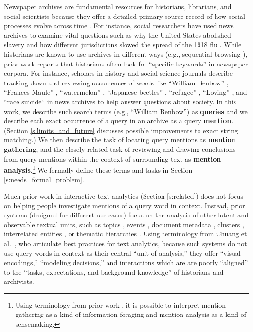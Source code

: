 Newspaper archives are fundamental resources for historians, librarians, and social scientists \cite{Chassanoff,allen} because they offer a detailed primary source record of how social processes evolve across time \cite{pierson2004politics}.
For instance, social researchers have used news archives to examine vital questions such as why the United States abolished slavery \cite{foner1995free} and how different jurisdictions slowed the spread of the 1918 flu \cite{jama}.
While historians are known to use archives in different ways (e.g., sequential browsing \cite{allen}), prior work reports that historians often look for ``specific keywords'' \cite[p. 2]{allen} in newspaper corpora.
For instance, scholars in history and social science journals describe tracking down and reviewing occurrences of words like
``William Benbow'' \cite{Putnam},
{``Frances Maule''} \cite{FrancesMaule},
{``watermelon'' }\cite{watermelon},
{``Japanese beetles''} \cite{japanesebeetles},
{``refugee''} \cite{katrinarefugee},
{``Loving''} \cite{Loving}, and
{``race suicide''} \cite{racesuicide}
in news archives
to help answer questions about society.
In this work, we describe such search terms (e.g., ``William Benbow'') as \textbf{queries} and we describe each exact occurrence of a query in an archive as a query \textbf{mention}.
(Section \ref{s:limits_and_future} discusses possible improvements to exact string matching.)
We then describe the task of locating query mentions as \textbf{mention gathering}, and the closely-related task of reviewing and drawing conclusions from query mentions within the context of surrounding text as \textbf{mention analysis}.\footnote{
Using terminology from prior work \cite{pirolli2005sensemaking}, it is possible to interpret mention gathering as a kind of information foraging and mention analysis as a kind of sensemaking.}
We formally define these terms and tasks in Section \ref{s:needs_formal_problem}.

Much prior work in interactive text analytics (Section \ref{s:related}) does not focus on helping people investigate mentions of a query word in context.
Instead, prior systems (designed for different use cases) focus on the analysis of other latent and observable textual units, such as topics \cite{tiara}, events \cite{eventriver}, document metadata \cite{pivotpaths}, clusters \cite{starspire}, interrelated entities \cite{Gorg2013JigsawReflections}, or thematic hierarchies \cite{overview}. Using terminology from Chuang et al.\ \cite{chuangheer}, who articulate best practices for text analytics, because such systems do not use query words in context as their central ``unit of analysis,'' they offer ``visual encodings,'' ``modeling decisions,'' and interactions which are are poorly ``aligned'' to the ``tasks, expectations, and background knowledge'' of historians and archivists. 

